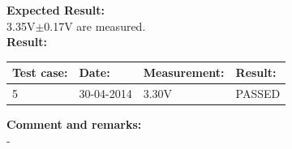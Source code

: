 \begin{figure}[H]
	\centering

\end{figure}

\textbf{Expected Result:}\\
3.35V$\pm$0.17V are measured.\\

\textbf{Result:}
\begin{table}[H]
\centering
\begin{tabular}{|p{2cm}|p{2cm}|p{3cm}|p{2cm}|}\hline
\textbf{Test case:} & \textbf{Date:} & \textbf{Measurement:} & \textbf{Result:} \\ \hline
5 & 30-04-2014 & 3.30V & PASSED \\ \hline
\end{tabular}
\end{table}

\textbf{Comment and remarks:}\\
-\\

